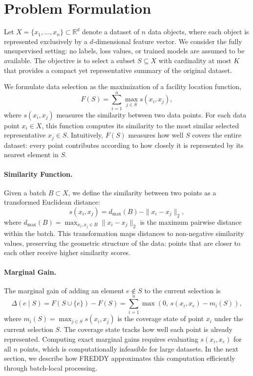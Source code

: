 \documentclass{article}
\begin{document}
\section{Problem Formulation}

Let $X = \{x_1,\dots,x_n\} \subset \mathbb{R}^d$ denote a dataset of $n$ data objects,
where each object is represented exclusively by a $d$-dimensional feature vector.
We consider the fully unsupervised setting: no labels, loss values, or trained models
are assumed to be available.
The objective is to select a subset $S \subseteq X$ with cardinality at most $K$
that provides a compact yet representative summary of the original dataset.

We formulate data selection as the maximization of a facility location function,
\begin{equation}
\label{eq:objective}
F(S) = \sum_{i=1}^{n} \max_{j \in S} s(x_i, x_j),
\end{equation}
where $s(x_i, x_j)$ measures the similarity between two data points.
For each data point $x_i \in X$, this function computes its similarity to the most
similar selected representative $x_j \in S$.
Intuitively, $F(S)$ measures how well $S$ covers the entire dataset: every point
contributes according to how closely it is represented by its nearest element in $S$.

\paragraph{Similarity Function.}
Given a batch $B \subset X$, we define the similarity between two points as a
transformed Euclidean distance:
\begin{equation}
\label{eq:similarity}
s(x_i, x_j) = d_{\max}(B) - \|x_i - x_j\|_2,
\end{equation}
where $d_{\max}(B) = \max_{x_i, x_j \in B} \|x_i - x_j\|_2$ is the maximum pairwise
distance within the batch.
This transformation maps distances to non-negative similarity values, preserving the
geometric structure of the data: points that are closer to each other receive higher
similarity scores.

\paragraph{Marginal Gain.}
The marginal gain of adding an element $e \notin S$ to the current selection is
\begin{equation}
\label{eq:marginal}
\Delta(e \mid S) = F(S \cup \{e\}) - F(S)
= \sum_{i=1}^{n} \max\left(0,\, s(x_i, x_e) - m_i(S)\right),
\end{equation}
where $m_i(S) = \max_{j \in S} s(x_i, x_j)$ is the coverage state of point $x_i$
under the current selection $S$.
The coverage state tracks how well each point is already represented.
Computing exact marginal gains requires evaluating $s(x_i, x_e)$ for all $n$ points,
which is computationally infeasible for large datasets.
In the next section, we describe how FREDDY approximates this computation
efficiently through batch-local processing.
\end{document}
